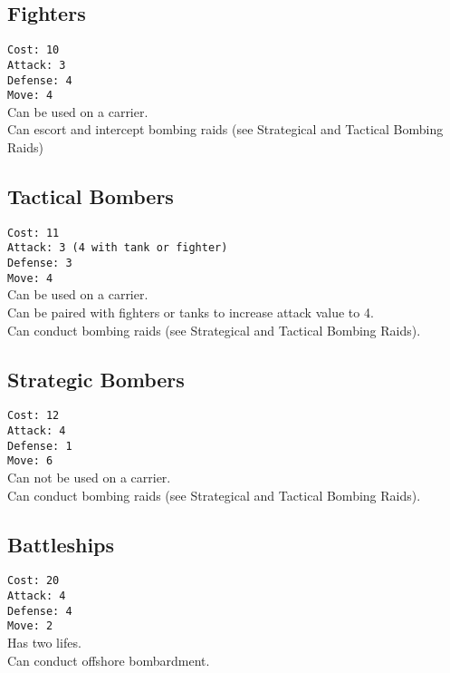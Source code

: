 \documentclass[10pt,a4paper,landscape]{article}
\begin{document}
\begin{multicols*}{3}
\subsection*{Fighters}
\texttt{Cost: 10 \\ Attack: 3 \\ Defense: 4 \\ Move: 4}
\\
Can be used on a carrier.\\
Can escort and intercept bombing raids (see \glqq Strategical and Tactical Bombing Raids\grqq)

\subsection*{Tactical Bombers}
\texttt{Cost: 11 \\ Attack: 3 (4 with tank or fighter) \\ Defense: 3 \\ Move: 4}
\\
Can be used on a carrier.\\
Can be paired with fighters or tanks to increase attack value to 4.\\
Can conduct bombing raids (see \glqq Strategical and Tactical Bombing Raids\grqq).

\subsection*{Strategic Bombers}
\texttt{Cost: 12 \\ Attack: 4 \\ Defense: 1 \\ Move: 6}
\\
Can not be used on a carrier.\\
Can conduct bombing raids (see \glqq Strategical and Tactical Bombing Raids\grqq).

\subsection*{Battleships}
\texttt{Cost: 20 \\ Attack: 4 \\ Defense: 4 \\ Move: 2}
\\
Has two lifes.\\
Can conduct offshore bombardment.


\end{multicols*}
\end{document}
